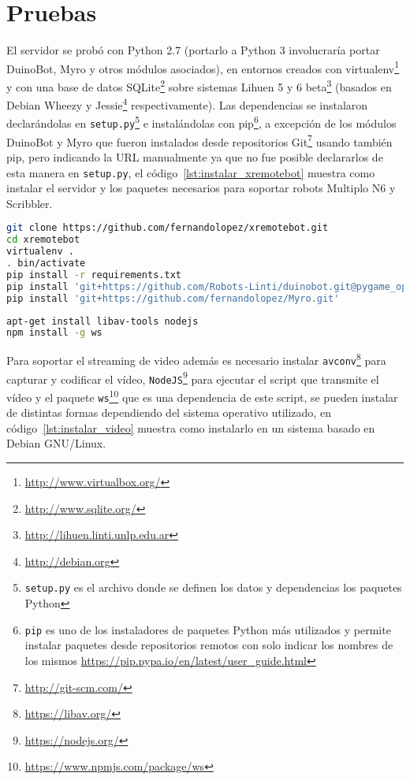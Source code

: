 \chapter{Pruebas}\label{cha:pruebas}

El servidor se probó con Python 2.7 (portarlo a Python 3 involucraría
portar DuinoBot, Myro y otros módulos asociados), en entornos creados
con virtualenv\footnote{\url{http://www.virtualbox.org/}}
y con una base de datos
SQLite\footnote{\url{http://www.sqlite.org/}}
sobre
sistemas Lihuen 5 y 6 beta\footnote{\url{http://lihuen.linti.unlp.edu.ar}}
(basados en Debian Wheezy y Jessie\footnote{\url{http://debian.org}}
respectivamente).
Las dependencias se instalaron declarándolas en
\texttt{setup.py}\footnote{\texttt{setup.py} es el archivo donde se definen los
datos y dependencias los paquetes Python}
e instalándolas
con pip\footnote{\texttt{pip} es uno de los instaladores de paquetes Python
más utilizados y permite instalar paquetes desde repositorios remotos
con solo indicar los nombres de los mismos
\url{https://pip.pypa.io/en/latest/user_guide.html}},
a excepción de los módulos DuinoBot y Myro que fueron instalados
desde repositorios Git\footnote{\url{http://git-scm.com/}}
usando también pip, pero indicando la URL manualmente
ya que no fue posible declararlos de esta manera en \texttt{setup.py}, el
código~\ref{lst:instalar_xremotebot} muestra como instalar el servidor
y los paquetes necesarios para soportar robots Multiplo N6 y Scribbler.

\begin{lstlisting}[language=bash,
caption={Instalación de XRemoteBot},
label=lst:instalar_xremotebot]
git clone https://github.com/fernandolopez/xremotebot.git
cd xremotebot
virtualenv .
. bin/activate
pip install -r requirements.txt
pip install 'git+https://github.com/Robots-Linti/duinobot.git@pygame_opcional'
pip install 'git+https://github.com/fernandolopez/Myro.git'
\end{lstlisting}

\begin{lstlisting}[language=bash,
caption={Instalación del soporte de video para XRemoteBot},
label=lst:instalar_video]
apt-get install libav-tools nodejs
npm install -g ws
\end{lstlisting}

Para soportar el streaming de video además es necesario instalar
\texttt{avconv}\footnote{\url{https://libav.org/}} para capturar
y codificar el vídeo,
\texttt{NodeJS}\footnote{\url{https://nodejs.org/}} para ejecutar
el script que transmite el vídeo
y el paquete
\texttt{ws}\footnote{\url{https://www.npmjs.com/package/ws}}
que es una dependencia de este script,
se pueden instalar de distintas formas dependiendo del sistema operativo
utilizado, en código~\ref{lst:instalar_video} muestra como instalarlo
en un sistema basado en Debian GNU/Linux.

